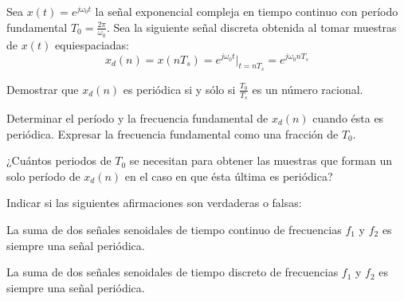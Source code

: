 \begin{ejercicio}
Sea $x(t)=e^{j\omega_0t}$ la señal exponencial compleja en tiempo continuo con período fundamental $T_0=\frac{2\pi}{\omega_0}$. Sea la siguiente señal discreta obtenida al tomar muestras de $x(t)$ equiespaciadas:
\begin{equation*}
    x_d(n) = x(nT_s) = e^{j\omega_0t}\big|_{t=nT_s} = e^{j\omega_0nT_s}
\end{equation*}

\inciso Demostrar que $x_d(n)$ es periódica si y sólo si $\frac{T_0}{T_s}$ es un número racional.

\inciso Determinar el período y la frecuencia fundamental de $x_d(n)$ cuando ésta es periódica. Expresar la frecuencia fundamental como una fracción de $T_0$.

\inciso ¿Cuántos periodos de $T_0$ se necesitan para obtener las muestras que forman un solo período de $x_d(n)$ en el caso en que ésta última es periódica?
\end{ejercicio}

\begin{ejercicio}
    Indicar si las siguientes afirmaciones son verdaderas o falsas:
    
    \inciso La suma de dos señales senoidales de tiempo continuo de frecuencias $f_1$ y $f_2$ es siempre una señal periódica. 
    
    \inciso La suma de dos señales senoidales de tiempo discreto de frecuencias $f_1$ y $f_2$ es siempre una señal periódica. 
    
\end{ejercicio}


